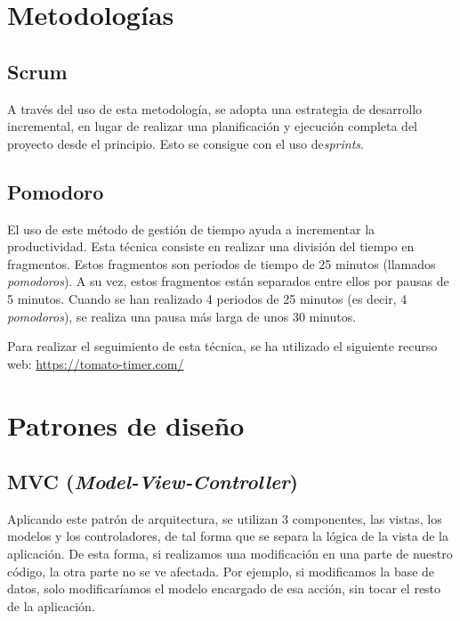 
\section{Metodologías}\label{metodologias}

\subsection{Scrum}\label{scrum}

A través del uso de esta metodología, se adopta una estrategia de desarrollo incremental, en lugar de realizar una planificación y ejecución completa del proyecto desde el principio. Esto se consigue con el uso de\emph{sprints}.

\subsection{Pomodoro}\label{pomodoro}

El uso de este método de gestión de tiempo ayuda a incrementar la productividad. Esta técnica consiste en realizar una división del tiempo en fragmentos. Estos fragmentos son periodos de tiempo de 25 minutos (llamados \emph{pomodoros}). A su vez, estos fragmentos están separados entre ellos por pausas de 5 minutos. Cuando se han realizado 4 periodos de 25 minutos (es decir, 4 \emph{pomodoros}), se realiza una pausa más larga de unos 30 minutos.

Para realizar el seguimiento de esta técnica, se ha utilizado el siguiente recurso web: \href{https://tomato-timer.com/}{https://tomato-timer.com/}

\section{Patrones de diseño}\label{patrones_de_diseño}

\subsection{MVC (\emph{Model-View-Controller})}\label{mode-view-conroller}

Aplicando este patrón de arquitectura, se utilizan 3 componentes, las vistas, los modelos y los controladores, de tal forma que se separa la lógica de la vista de la aplicación. De esta forma, si realizamos una modificación en una parte de nuestro código, la otra parte no se ve afectada. Por ejemplo, si modificamos la base de datos, solo modificaríamos el modelo encargado de esa acción, sin tocar el resto de la aplicación.

